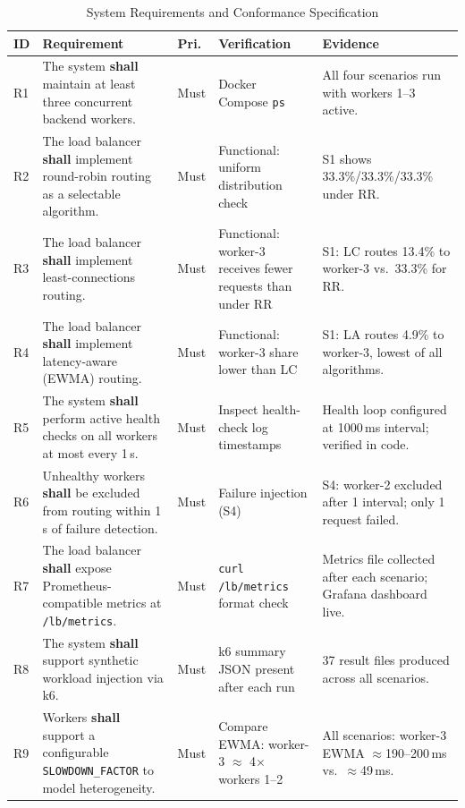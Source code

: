 \documentclass[conference]{IEEEtran}
\begin{document}
\begin{table}[t]
\caption{System Requirements and Conformance Specification}
\label{tab:requirements}
\centering
\small
\renewcommand{\arraystretch}{1.15}
\begin{tabular}{@{}p{0.5cm}p{4.9cm}p{1.6cm}p{3.2cm}p{3.1cm}@{}}
\toprule
\textbf{ID} & \textbf{Requirement} & \textbf{Pri.} & \textbf{Verification} & \textbf{Evidence} \\
\midrule
R1  & The system \textbf{shall} maintain at least three concurrent backend workers.
    & Must & Docker Compose \texttt{ps}
    & All four scenarios run with workers 1--3 active. \\
R2  & The load balancer \textbf{shall} implement round-robin routing as a selectable algorithm.
    & Must & Functional: uniform distribution check
    & S1 shows 33.3\%/33.3\%/33.3\% under RR. \\
R3  & The load balancer \textbf{shall} implement least-connections routing.
    & Must & Functional: worker-3 receives fewer requests than under RR
    & S1: LC routes 13.4\% to worker-3 vs.\ 33.3\% for RR. \\
R4  & The load balancer \textbf{shall} implement latency-aware (EWMA) routing.
    & Must & Functional: worker-3 share lower than LC
    & S1: LA routes 4.9\% to worker-3, lowest of all algorithms. \\
R5  & The system \textbf{shall} perform active health checks on all workers at most every 1\,s.
    & Must & Inspect health-check log timestamps
    & Health loop configured at 1000\,ms interval; verified in code. \\
R6  & Unhealthy workers \textbf{shall} be excluded from routing within 1\,s of failure detection.
    & Must & Failure injection (S4)
    & S4: worker-2 excluded after 1 interval; only 1 request failed. \\
R7  & The load balancer \textbf{shall} expose Prometheus-compatible metrics at \texttt{/lb/metrics}.
    & Must & \texttt{curl /lb/metrics} format check
    & Metrics file collected after each scenario; Grafana dashboard live. \\
R8  & The system \textbf{shall} support synthetic workload injection via k6.
    & Must & k6 summary JSON present after each run
    & 37 result files produced across all scenarios. \\
R9  & Workers \textbf{shall} support a configurable \texttt{SLOWDOWN\_FACTOR} to model heterogeneity.
    & Must & Compare EWMA: worker-3 $\approx$ 4$\times$ workers 1--2
    & All scenarios: worker-3 EWMA $\approx$190--200\,ms vs.\ $\approx$49\,ms. \\

\end{tabular}
\end{table}
\end{document}
